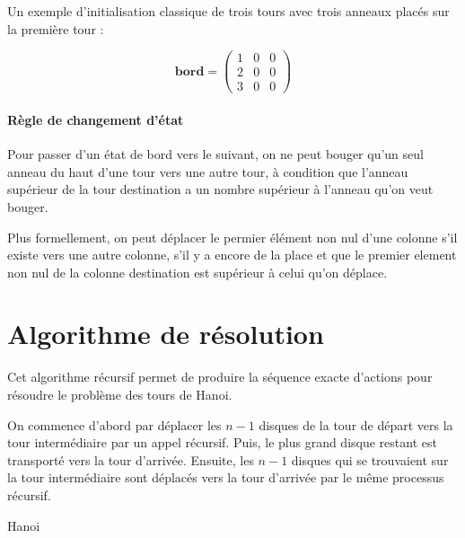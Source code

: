Un exemple d'initialisation classique de trois tours avec trois anneaux placés sur la première tour :

$$
\mathbf{bord} = 
\begin{pmatrix}
    1 & 0 & 0 \\
    2 & 0 & 0 \\
    3 & 0 & 0 
\end{pmatrix}$$

\paragraph{Règle de changement d'état}
Pour passer d'un état de bord vers le suivant, on ne peut bouger qu'un seul anneau du haut d'une tour vers une autre tour, à condition que l'anneau supérieur de la tour destination a un nombre supérieur à l'anneau qu'on veut bouger.
\par
Plus formellement, on peut déplacer le permier élément non nul d'une colonne s'il existe vers une autre colonne, s'il y a encore de la place et que le premier element non nul de la colonne destination est supérieur à celui qu'on déplace.

\section{Algorithme de résolution}
Cet algorithme récursif permet de produire la séquence exacte d'actions pour résoudre le problème des tours de Hanoi.
\par

On commence d'abord par déplacer les $n - 1$ disques de la tour de départ vers la tour intermédiaire par un appel récursif. Puis, le plus grand disque restant est transporté vers la tour d'arrivée. Ensuite, les $n - 1$ disques qui se trouvaient sur la tour intermédiaire sont déplacés vers la tour d'arrivée par le même processus récursif.

\begin{algorithm}[H]
    \SetAlgoLined
    \caption{Hanoi}
\end{algorithm}

